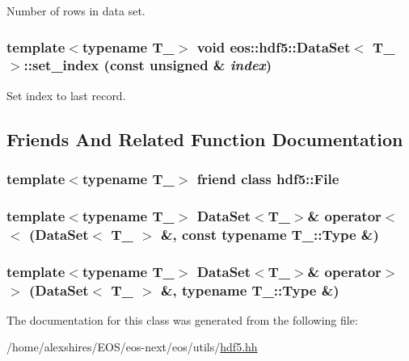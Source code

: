 Number of rows in data set. \hypertarget{classeos_1_1hdf5_1_1DataSet_ac0a8fc9de491f3cd8b5ffd625ac1728a}{
\subsubsection[{set\_\-index}]{\setlength{\rightskip}{0pt plus 5cm}template$<$typename T\_\-$>$ void {\bf eos::hdf5::DataSet}$<$ T\_\- $>$::set\_\-index (const unsigned \& {\em index})}}
\label{classeos_1_1hdf5_1_1DataSet_ac0a8fc9de491f3cd8b5ffd625ac1728a}


Set index to last record. 

\subsection{Friends And Related Function Documentation}
\hypertarget{classeos_1_1hdf5_1_1DataSet_a19bee9643036cfb3f6908fb332e14f27}{
\subsubsection[{hdf5::File}]{\setlength{\rightskip}{0pt plus 5cm}template$<$typename T\_\-$>$ friend class {\bf hdf5::File}}}
\label{classeos_1_1hdf5_1_1DataSet_a19bee9643036cfb3f6908fb332e14f27}
\hypertarget{classeos_1_1hdf5_1_1DataSet_adaf39b7e1ded5e8b0b8c5a256b7cff8a}{
\subsubsection[{operator$<$$<$}]{\setlength{\rightskip}{0pt plus 5cm}template$<$typename T\_\-$>$ {\bf DataSet}$<$T\_\-$>$\& operator$<$$<$ ({\bf DataSet}$<$ T\_\- $>$ \&, \/  const typename T\_\-::Type \&)}}
\label{classeos_1_1hdf5_1_1DataSet_adaf39b7e1ded5e8b0b8c5a256b7cff8a}
\hypertarget{classeos_1_1hdf5_1_1DataSet_ab6a61cb7ace6043e703b61ba382dfbec}{
\subsubsection[{operator$>$$>$}]{\setlength{\rightskip}{0pt plus 5cm}template$<$typename T\_\-$>$ {\bf DataSet}$<$T\_\-$>$\& operator$>$$>$ ({\bf DataSet}$<$ T\_\- $>$ \&, \/  typename T\_\-::Type \&)}}
\label{classeos_1_1hdf5_1_1DataSet_ab6a61cb7ace6043e703b61ba382dfbec}


The documentation for this class was generated from the following file:\begin{DoxyCompactItemize}
\item 
/home/alexshires/EOS/eos-\/next/eos/utils/\hyperlink{hdf5_8hh}{hdf5.hh}\end{DoxyCompactItemize}
